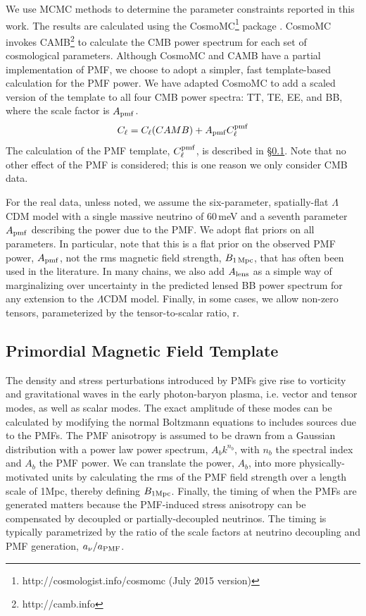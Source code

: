 \documentclass[apj]{emulateapj}
\newcommand{\cpmf}{\ensuremath{C_{\ell}^{\rm pmf}}}
\newcommand{\apmf}{\ensuremath{A_{\rm pmf}}}
\newcommand{\bpmf}{\ensuremath{B_{\rm 1\,Mpc}}}
\newcommand{\alens}{\ensuremath{A_{\rm lens}}}
\newcommand{\lcdm}{\ensuremath{\Lambda}CDM}
\newcommand{\be}{\begin{equation}}
\newcommand{\ee}{\end{equation}}
\begin{document}
We use MCMC methods to determine the parameter constraints reported in this work. 
The results are calculated using  the {\textsc CosmoMC}\footnote{http://cosmologist.info/cosmomc (July 2015 version)} package \citep{lewis02b}. 
CosmoMC invokes  CAMB\footnote{http://camb.info}  \citep{lewis00} to calculate the CMB power spectrum for each set of cosmological parameters. 
Although CosmoMC and CAMB have a partial implementation of PMF, we choose to adopt a simpler, fast template-based calculation for the PMF power. 
We have adapted CosmoMC to add a scaled version of the template to all four CMB power spectra: TT, TE, EE, and BB, where the scale factor is \apmf. 
\be
C_\ell = C_\ell (CAMB) + \apmf \cpmf
\ee
The calculation of the PMF template, \cpmf, is described in \S\ref{sec:template}. 
Note that no other effect of the PMF is considered; this is one reason we only consider CMB data.

For the real data, unless noted, we assume the six-parameter, spatially-flat \lcdm{} model with a single massive neutrino of 60\,meV and a seventh parameter \apmf{} describing the power due to the PMF. 
We adopt flat priors on all parameters. 
In particular, note that this is a flat prior on the observed PMF power, $\apmf$, not the rms magnetic field strength, \bpmf, that has often been used in the literature. 
In many chains, we also add \alens{} as a simple way of marginalizing over uncertainty in the predicted lensed BB power spectrum for any extension to the \lcdm{} model. 
Finally, in some cases, we allow non-zero tensors, parameterized by the tensor-to-scalar ratio, r. 

\subsection{Primordial Magnetic Field Template}
\label{sec:template}

The density and stress perturbations introduced by PMFs give rise to vorticity and gravitational waves in the early photon-baryon  plasma, i.e. vector and tensor modes, as well as scalar modes. 
The exact amplitude of these modes can be calculated by modifying the normal Boltzmann equations to includes sources due to the PMFs. 
The PMF anisotropy is assumed to be drawn from a Gaussian distribution with a power law power spectrum, $A_b k^{n_b}$, with $n_b$ the spectral index and $A_b$ the PMF power. 
We can translate the power, $A_b$, into more physically-motivated units by calculating the rms of the PMF field strength over a length scale of 1\rm{Mpc}, thereby defining $B_{\rm{1Mpc}}$. 
Finally, the timing of when the PMFs are generated matters because the PMF-induced stress anisotropy can be compensated by decoupled or partially-decoupled neutrinos. 
The timing is typically parametrized by the ratio of the scale factors at neutrino decoupling and PMF generation, $a_{\nu}/a_{\rm{PMF}}$. 
\end{document}
